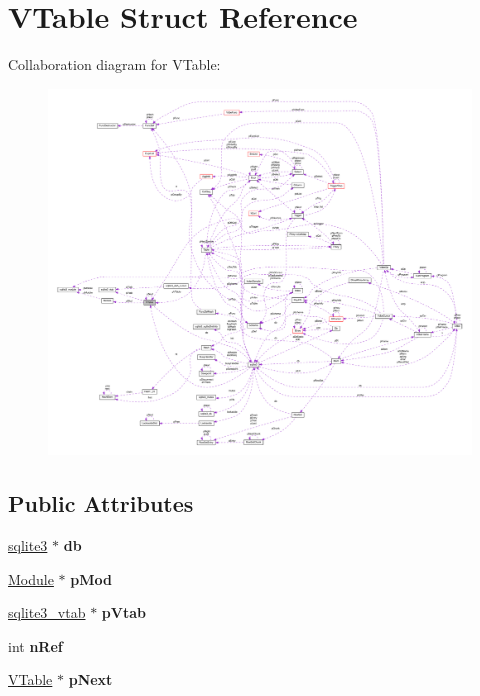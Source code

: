 \hypertarget{struct_v_table}{\section{V\-Table Struct Reference}
\label{struct_v_table}
}


Collaboration diagram for V\-Table\-:\nopagebreak
\begin{figure}[H]
\begin{center}
\leavevmode
\includegraphics[width=350pt]{struct_v_table__coll__graph}
\end{center}
\end{figure}
\subsection*{Public Attributes}
\begin{DoxyCompactItemize}
\item 
\hypertarget{struct_v_table_a855b43c118d693910e9060cc9d9ac91a}{\hyperlink{structsqlite3}{sqlite3} $\ast$ {\bfseries db}}\label{struct_v_table_a855b43c118d693910e9060cc9d9ac91a}

\item 
\hypertarget{struct_v_table_ae444452a7168e2f4224a75768abe8312}{\hyperlink{struct_module}{Module} $\ast$ {\bfseries p\-Mod}}\label{struct_v_table_ae444452a7168e2f4224a75768abe8312}

\item 
\hypertarget{struct_v_table_ae15b9cb002c013019dcbac919bda9ac8}{\hyperlink{structsqlite3__vtab}{sqlite3\-\_\-vtab} $\ast$ {\bfseries p\-Vtab}}\label{struct_v_table_ae15b9cb002c013019dcbac919bda9ac8}

\item 
\hypertarget{struct_v_table_a12ffe156e5e8e7d19ed029ccfe4ab5dc}{int {\bfseries n\-Ref}}\label{struct_v_table_a12ffe156e5e8e7d19ed029ccfe4ab5dc}

\item 
\hypertarget{struct_v_table_af3cac5e5a38508d0111acb9aa6c5f435}{\hyperlink{struct_v_table}{V\-Table} $\ast$ {\bfseries p\-Next}}\label{struct_v_table_af3cac5e5a38508d0111acb9aa6c5f435}

\end{DoxyCompactItemize}



